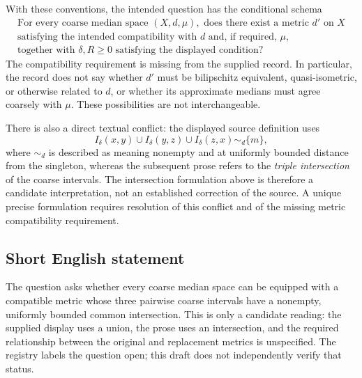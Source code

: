 \documentclass[11pt]{article}
\begin{document}
With these conventions, the intended question has the conditional schema
\[
 \begin{gathered}
 \text{For every coarse median space }(X,d,\mu),\text{ does there exist a metric }d'\text{ on }X\\
 \text{satisfying the intended compatibility with }d\text{ and, if required, }\mu,\\
 \text{together with }\delta,R\geq 0\text{ satisfying the displayed condition?}
 \end{gathered}
\]
The compatibility requirement is missing from the supplied record. In particular, the record does not say whether $d'$ must be bilipschitz equivalent, quasi-isometric, or otherwise related to $d$, or whether its approximate medians must agree coarsely with $\mu$. These possibilities are not interchangeable.

There is also a direct textual conflict: the displayed source definition uses
\[
 I_\delta(x,y)\cup I_\delta(y,z)\cup I_\delta(z,x)\sim_d\{m\},
\]
where $\sim_d$ is described as meaning nonempty and at uniformly bounded distance from the singleton, whereas the subsequent prose refers to the \emph{triple intersection} of the coarse intervals. The intersection formulation above is therefore a candidate interpretation, not an established correction of the source. A unique precise formulation requires resolution of this conflict and of the missing metric compatibility requirement.
\subsection{Short English statement}
The question asks whether every coarse median space can be equipped with a compatible metric whose three pairwise coarse intervals have a nonempty, uniformly bounded common intersection. This is only a candidate reading: the supplied display uses a union, the prose uses an intersection, and the required relationship between the original and replacement metrics is unspecified. The registry labels the question open; this draft does not independently verify that status.
\end{document}
